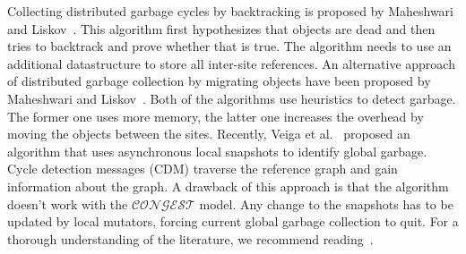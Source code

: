 Collecting distributed garbage cycles by backtracking is proposed by Maheshwari
and Liskov~\cite{liskov97}. This algorithm first hypothesizes that objects are dead and
then tries to backtrack and prove whether that is true. The algorithm
needs to use an additional datastructure to store all inter-site references.
An alternative approach of distributed garbage collection by
migrating objects have been proposed by Maheshwari and Liskov~\cite{liskov95}. Both
of the algorithms use heuristics to detect garbage. The former one uses more
memory, the latter one increases the overhead by moving the objects between the
sites. Recently, Veiga et al.~\cite{Veiga} proposed an algorithm that uses
asynchronous local snapshots to identify global garbage. Cycle detection
messages (CDM) traverse the reference graph and gain information about the
graph. A drawback of this approach is that the algorithm doesn't work with the $\mathcal{CONGEST}$ model. %
Any change to the snapshots
has to be updated by local mutators, forcing current global garbage collection
to quit. For a thorough understanding of the literature, we recommend reading~\cite{shapiro95, Abu}.




